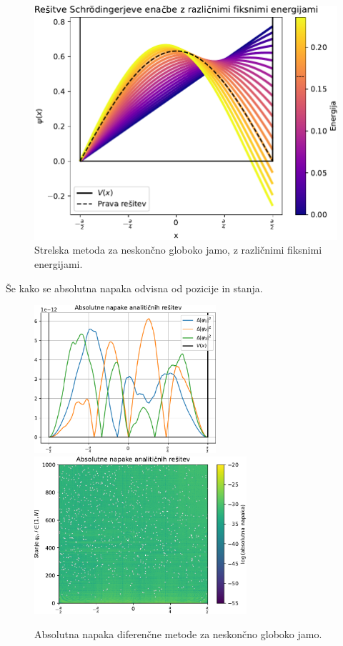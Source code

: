 \begin{figure}[h]
    \centering
    \includegraphics[width=\textwidth]{pdfs/neskoncna_jama_strelska_vec.pdf}
    \caption{Strelska metoda za neskončno globoko jamo, z različnimi fiksnimi energijami.}
\end{figure}
Še kako se absolutna napaka odvisna od pozicije in stanja.
\newpage
\begin{figure}[h]
    \centering
    \includegraphics[width=0.6\textwidth]{pdfs/neskoncna_jama_absolutne.pdf}
    \includegraphics[width=0.7\textwidth]{pdfs/neskoncna_jama_absolutne_barva.pdf}

    \caption{Absolutna napaka diferenčne metode za neskončno globoko jamo.}
\end{figure}
